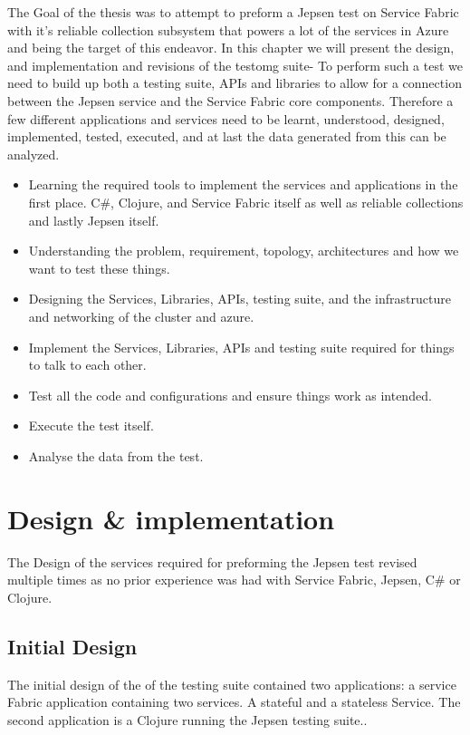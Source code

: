 \documentclass[a4paper,10pt,titlepage]{report}
\begin{document}
    The Goal of the thesis was to attempt to preform a Jepsen test on Service Fabric with it's reliable collection subsystem that powers a lot of the services in Azure and being the target of this endeavor. 
    In this chapter we will present the design, and implementation and revisions of the testomg suite-
    To perform such a test we need to build up both a testing suite, APIs and libraries to allow for a connection between the Jepsen service and the Service Fabric core components. Therefore a few different applications and services need to be learnt, understood, designed, implemented, tested, executed, and at last the data generated from this can be analyzed.
    \begin{itemize}
        \item Learning the required tools to implement the services and applications in the first place. C\#, Clojure, and Service Fabric itself as well as reliable collections and lastly Jepsen itself.
        \item Understanding the problem, requirement, topology, architectures and how we want to test these things.
        \item Designing the Services, Libraries, APIs, testing suite, and the infrastructure and networking of the cluster and azure.
        \item Implement the Services, Libraries, APIs and testing suite required for things to talk to each other.
        \item Test all the code and configurations and ensure things work as intended.
        \item Execute the test itself.
        \item Analyse the data from the test.
    \end{itemize}

   


    \section{Design \& implementation}
    The Design of the services required for preforming the Jepsen test revised multiple times as no prior experience was had with Service Fabric, Jepsen, C\# or Clojure.

    \subsection{Initial Design}

    The initial design of the of the testing suite contained two applications: a service Fabric application containing two services. A stateful and a stateless Service. The second application is a Clojure running the Jepsen testing suite..
\end{document}
